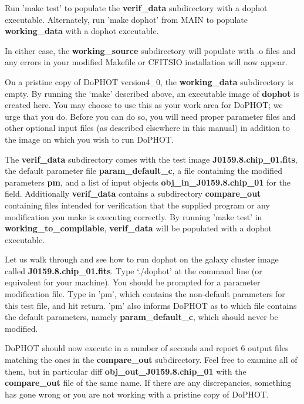 Run 'make test' to populate the {\bf verif\_data} subdirectory with a dophot 
executable.
Alternately, run 'make dophot' from MAIN to populate {\bf working\_data} 
with a dophot executable.

In either case, the {\bf working\_source} subdirectory will populate with
.o files and any errors in your modified Makefile or CFITSIO installation 
will now appear.

	On a pristine copy of DoPHOT version4\_0, the {\bf working\_data}
subdirectory is empty. By running the `make' described above, an executable
image of {\bf dophot} is created here. You may choose to use this 
as your work area for DoPHOT; we urge that you do. Before you can do so, 
you will need proper parameter files and other optional input files
(as described elsewhere in this manual) in addition to the image on which
you wish to run DoPHOT. 

	The {\bf verif\_data} subdirectory comes with the test image 
{\bf J0159.8.chip\_01.fits}, the default parameter file 
{\bf param\_default\_c}, a file containing the modified parameters {\bf pm}, 
and a list of input objects {\bf obj\_in\_J0159.8.chip\_01} for the field. Additionally 
{\bf verif\_data} contains a subdirectory {\bf compare\_out} containing files 
intended for verification that the supplied program or any modification you 
make is executing correctly.  By running 'make test' in 
{\bf working\_to\_compilable}, {\bf verif\_data} will be populated with a 
dophot executable.

Let us walk through and see how to run dophot on the galaxy cluster image 
called {\bf J0159.8.chip\_01.fits}.  
Type `./dophot' at the command line (or equivalent for your machine).  You 
should be prompted for a parameter modification file.  Type in 'pm', which 
contains the non-default parameters for this test file, and hit return.  'pm' also 
informs DoPHOT as to which file contains the default parameters, namely 
{\bf param\_default\_c}, which should never be modified.  

DoPHOT should now execute in a number of seconds and report 6 output files 
matching the ones in the {\bf compare\_out} subdirectory. Feel free to examine 
all of them, but in particular diff {\bf obj\_out\_J0159.8.chip\_01} with 
the {\bf compare\_out} file of the same name.  If there are any discrepancies, 
something has gone wrong or you are not working with a pristine copy of 
DoPHOT. 












